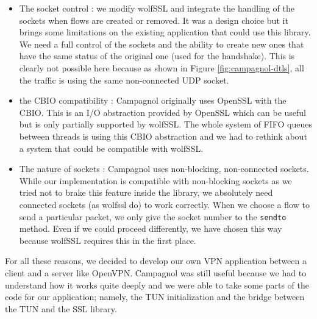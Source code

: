\begin{itemize}
\item The socket control : we modify wolfSSL and integrate the handling of the sockets when flows are  created or removed. It was a design choice but it brings some limitations on the existing application that could use this library. We need a full control of the sockets and the ability to create new ones that have the same status of the original one (used for the handshake). This is clearly not possible here because as shown in Figure \ref{fig:campagnol-dtls}, all the traffic is using the same non-connected UDP socket.
\item the CBIO compatibility : Campagnol originally uses OpenSSL \cite{openssl} with the CBIO. This is an I/O abstraction provided by OpenSSL which can be useful but is only partially supported by wolfSSL. The whole system of FIFO queues between threads is using this CBIO abstraction and we had to rethink about a system that could be compatible with wolfSSL.
\item The nature of sockets : Campagnol uses non-blocking, non-connected sockets. While our implementation is compatible with non-blocking sockets as we tried not to brake this feature inside the library, we absolutely need connected sockets (as wolfssl do) to work correctly. When we choose a flow to send a particular packet, we only give the socket number to the \texttt{sendto} method. Even if we could proceed differently, we have chosen this way because wolfSSL requires this in the first place.
\end{itemize}

For all these reasons, we decided to develop our own VPN application between a client and a server like OpenVPN. Campagnol was still useful because we had to understand how it works quite deeply and we were able to take some parts of the code for our application; namely, the TUN initialization and the bridge between the TUN and the SSL library.




